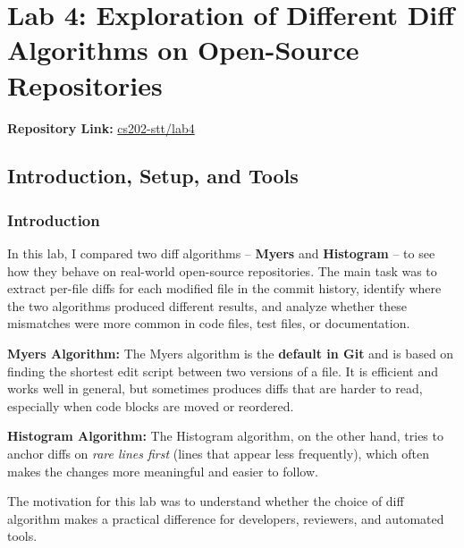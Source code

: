 \documentclass[10pt,a4paper]{report}
\begin{document}
\chapter{Lab 4: Exploration of Different Diff Algorithms on Open-Source Repositories}

\textbf{Repository Link:} \href{https://github.com/ShardulJunagade/cs202-stt/tree/main/lab4}{cs202-stt/lab4}

\section{Introduction, Setup, and Tools}

\subsection{Introduction}
In this lab, I compared two diff algorithms -- \textbf{Myers} and \textbf{Histogram} -- to see how they behave on real-world open-source repositories.  
The main task was to extract per-file diffs for each modified file in the commit history, identify where the two algorithms produced different results, and analyze whether these mismatches were more common in code files, test files, or documentation.  

\textbf{Myers Algorithm:} The Myers algorithm is the \textbf{default in Git} and is based on finding the shortest edit script between two versions of a file. It is efficient and works well in general, but sometimes produces diffs that are harder to read, especially when code blocks are moved or reordered.

\textbf{Histogram Algorithm:} The Histogram algorithm, on the other hand, tries to anchor diffs on \emph{rare lines first} (lines that appear less frequently), which often makes the changes more meaningful and easier to follow.

The motivation for this lab was to understand whether the choice of diff algorithm makes a practical difference for developers, reviewers, and automated tools.  
\end{document}
